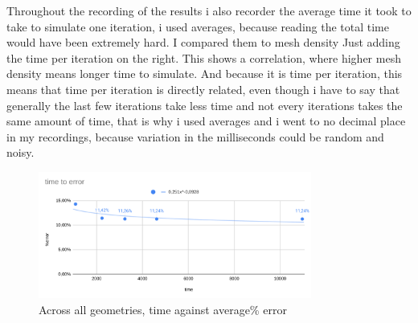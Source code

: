 \documentclass[12pt,a4paper]{article}
\begin{document}
\begin{table}[H]
\centering
\caption{All average \% iteration against all \% error and all average mesh elements against average \% error}
\label{tab:final_summary}
\end{table}

Throughout the recording of the results i also recorder the average time it took to take to simulate one iteration, i used averages, because reading the total time would have been extremely hard. I compared them to mesh density 
Just adding the time per iteration on the right. This shows a correlation, where higher mesh density means longer time to simulate.
And because it is time per iteration, this means that time per iteration is directly related, even though i have to say that generally the last few iterations take less time and not every iterations takes the same amount of time, that is why i used averages and i went to no decimal place in my recordings, because variation in the milliseconds could be random and noisy.

\begin{figure}[H]
\centering
\includegraphics[width=0.8\textwidth]{image6.png}
\caption{Across all geometries, time against average\% error}
\label{fig:time_vs_error}
\end{figure}
\end{document}
